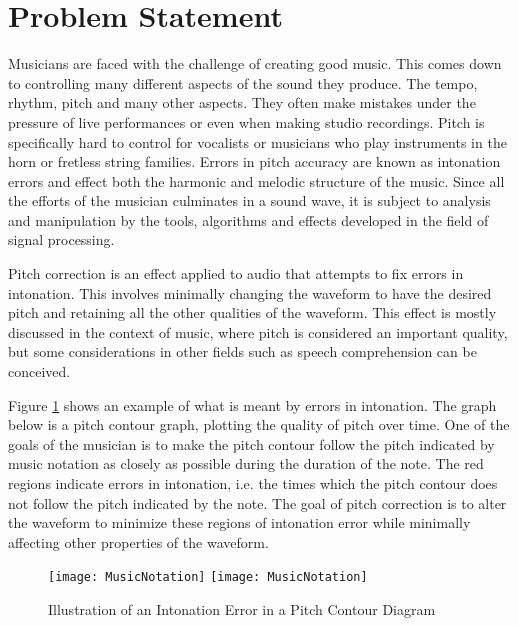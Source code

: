 
\section{Problem Statement}

Musicians are faced with the challenge of creating good music. This comes down to
controlling many different aspects of the sound they produce. The tempo, rhythm,
pitch and many other aspects. They often make mistakes under the pressure of live
performances or even when making studio recordings. Pitch is specifically hard to
control for vocalists or musicians who play instruments in the horn or fretless
string families. Errors in pitch accuracy are known as intonation errors and
effect both the harmonic and melodic structure of the music. Since all the efforts
of the musician culminates in a sound wave, it is subject to analysis and
manipulation by the tools, algorithms and effects developed in the field of signal
processing.

Pitch correction is an effect applied to audio that attempts to fix errors in
intonation. This involves minimally changing the waveform to have the desired
pitch and retaining all the other qualities of the waveform. This effect is mostly
discussed in the context of music, where pitch is considered an important quality,
but some considerations in other fields such as speech comprehension can be
conceived.

Figure \ref{fig:IntonationError} shows an example of what is meant by errors in
intonation. The graph below is a pitch contour graph, plotting the quality of
pitch over time. One of the goals of the musician is to make the pitch contour
follow the pitch indicated by music notation as closely as possible during the
duration of the note. The red regions indicate errors in intonation, i.e.  the
times which the pitch contour does not follow the pitch indicated by the note. The
goal of pitch correction is to alter the waveform to minimize these regions of
intonation error while minimally affecting other properties of the waveform.

\begin{figure}[b!]
	\texttt{[image: MusicNotation]}
	\texttt{[image: MusicNotation]}
	\caption{Illustration of an Intonation Error in a Pitch Contour Diagram}
	\label{fig:IntonationError}
\end{figure}


